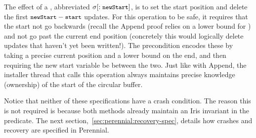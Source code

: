 The effect of a , abbreviated $\sigma[:\cc{newStart}]$, is to set
the start position and delete the first $\cc{newStart} - \cc{start}$ updates.
For this operation to be safe, it requires
that the start not go backwards (recall the Append proof relies on a lower bound
for ) and not go past the current end position (concretely this would
logically delete updates that haven't yet been written!). The precondition
encodes these by taking a precise current  position and a lower bound
on the end, and then requiring the new start variable be between the two. Just
like with Append, the installer thread that calls this operation always
maintains precise knowledge (ownership) of the start of the circular buffer.

Notice that neither of these specifications have a crash condition. The reason
this is not required is because both methods already maintain an Iris invariant in
the  predicate. The next
section,~\ref{sec:perennial:recovery-spec}, details how crashes and recovery are
specified in Perennial.

